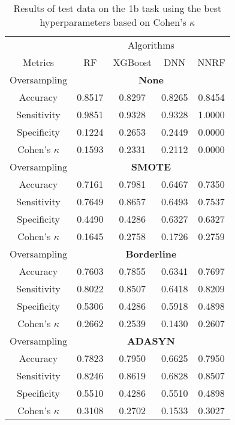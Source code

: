 \begin{table}[!htb]
\centering
\caption{Results of test data on the 1b task using the best hyperparameters based on Cohen's $\kappa$}
\label{tab:1b_test_results}
\begin{tabular}{c | c c c c}
\hline
 & \multicolumn{4}{c}{Algorithms}\\ 
Metrics &RF & XGBoost & DNN & NNRF\\ 
\hline
Oversampling &\multicolumn{4}{|c}{\textbf{None}}\\ 
\hline
Accuracy & 0.8517 & 0.8297 & 0.8265 & 0.8454\\ 
Sensitivity & 0.9851 & 0.9328 & 0.9328 & 1.0000\\ 
Specificity & 0.1224 & 0.2653 & 0.2449 & 0.0000\\ 
Cohen's $\kappa$ & 0.1593 & 0.2331 & 0.2112 & 0.0000\\ 
\hline
Oversampling &\multicolumn{4}{|c}{\textbf{SMOTE}}\\ 
\hline
Accuracy & 0.7161 & 0.7981 & 0.6467 & 0.7350\\ 
Sensitivity & 0.7649 & 0.8657 & 0.6493 & 0.7537\\ 
Specificity & 0.4490 & 0.4286 & 0.6327 & 0.6327\\ 
Cohen's $\kappa$ & 0.1645 & 0.2758 & 0.1726 & 0.2759\\ 
\hline
Oversampling &\multicolumn{4}{|c}{\textbf{Borderline}}\\ 
\hline
Accuracy & 0.7603 & 0.7855 & 0.6341 & 0.7697\\ 
Sensitivity & 0.8022 & 0.8507 & 0.6418 & 0.8209\\ 
Specificity & 0.5306 & 0.4286 & 0.5918 & 0.4898\\ 
Cohen's $\kappa$ & 0.2662 & 0.2539 & 0.1430 & 0.2607\\ 
\hline
Oversampling &\multicolumn{4}{|c}{\textbf{ADASYN}}\\ 
\hline
Accuracy & 0.7823 & 0.7950 & 0.6625 & 0.7950\\ 
Sensitivity & 0.8246 & 0.8619 & 0.6828 & 0.8507\\ 
Specificity & 0.5510 & 0.4286 & 0.5510 & 0.4898\\ 
Cohen's $\kappa$ & 0.3108 & 0.2702 & 0.1533 & 0.3027\\ 
\hline
\end{tabular}
\end{table}


